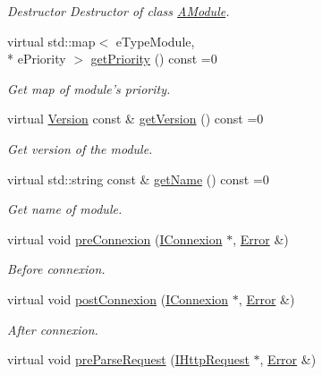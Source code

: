 \begin{DoxyCompactItemize}
\begin{DoxyCompactList}\small\item\em Destructor Destructor of class \hyperlink{classapimeal_1_1AModule}{A\-Module}. \end{DoxyCompactList}\item 
virtual std\-::map$<$ e\-Type\-Module, \\*
e\-Priority $>$ \hyperlink{classapimeal_1_1AModule_a86c37e1e56fa8b44d86e446630a731cb}{get\-Priority} () const =0
\begin{DoxyCompactList}\small\item\em Get map of module's priority. \end{DoxyCompactList}\item 
virtual \hyperlink{structapimeal_1_1Version}{Version} const \& \hyperlink{classapimeal_1_1AModule_a7567906eea190833d73f77f1da848b69}{get\-Version} () const =0
\begin{DoxyCompactList}\small\item\em Get version of the module. \end{DoxyCompactList}\item 
virtual std\-::string const \& \hyperlink{classapimeal_1_1AModule_ace61580f63d9c256df7659f23c471afc}{get\-Name} () const =0
\begin{DoxyCompactList}\small\item\em Get name of module. \end{DoxyCompactList}\item 
virtual void \hyperlink{classapimeal_1_1AModule_a5a6614e5e72edb9c5df2b92e1ece869a}{pre\-Connexion} (\hyperlink{classapimeal_1_1IConnexion}{I\-Connexion} $\ast$, \hyperlink{structapimeal_1_1Error}{Error} \&)
\begin{DoxyCompactList}\small\item\em Before connexion. \end{DoxyCompactList}\item 
virtual void \hyperlink{classapimeal_1_1AModule_aca21d0bfefef5455fcd6dd6f907fe283}{post\-Connexion} (\hyperlink{classapimeal_1_1IConnexion}{I\-Connexion} $\ast$, \hyperlink{structapimeal_1_1Error}{Error} \&)
\begin{DoxyCompactList}\small\item\em After connexion. \end{DoxyCompactList}\item 
virtual void \hyperlink{classapimeal_1_1AModule_afdc72a0d20e2e8d7c6bc738413981acc}{pre\-Parse\-Request} (\hyperlink{classapimeal_1_1IHttpRequest}{I\-Http\-Request} $\ast$, \hyperlink{structapimeal_1_1Error}{Error} \&)

\end{DoxyCompactItemize}
